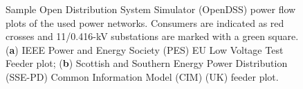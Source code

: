 \begin{figure}[htb]\centering
 \caption{Sample Open Distribution System Simulator (OpenDSS) power flow plots of the used power networks. Consumers are indicated as red crosses and 11/0.416-kV substations are marked with a green square. (\textbf{a}) IEEE Power and Energy Society (PES) EU Low Voltage Test Feeder plot; (\textbf{b}) Scottish and Southern Energy Power Distribution (SSE-PD) Common Information Model (CIM) (UK) feeder plot.}
 \label{ch1:fig:feeders}
\end{figure}
